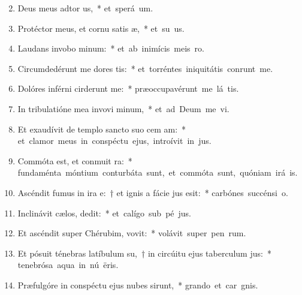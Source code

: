 \begin{flushleft}
\begin{enumerate}[leftmargin=*]
\setcounter{enumi}{1}

\item Deus meus adtor us,~* \mbox{et sperá  um.}
\item Protéctor meus, et cornu satis æ,~* \mbox{et su us.}
\item Laudans invobo minum:~* \mbox{et ab inimícis meis  ro.}
\item Circumdedérunt me dores tis:~* \mbox{et torréntes iniquitátis conrunt me.}
\item Dolóres inférni cirderunt me:~* \mbox{præoccupavérunt me lá tis.}
\item In tribulatióne mea invovi minum,~* \mbox{et ad Deum me vi.}
\item Et exaudívit de templo sancto suo cem am:~* \mbox{et clamor meus in conspéctu ejus, introívit in  jus.}
\item Commóta est, et conmuit ra:~* \mbox{fundaménta móntium conturbáta sunt, et commóta sunt, quóniam irá  is.}
\item Ascéndit fumus in ira e:~† et ignis a fácie jus esit:~* \mbox{carbónes succénsi   o.}
\item Inclinávit cælos,  dedit:~* \mbox{et calígo sub pé jus.}
\item Et ascéndit super Chérubim,  vovit:~* \mbox{volávit super pen rum.}
\item Et pósuit ténebras latíbulum su,~† in circúitu ejus taberculum jus:~* \mbox{tenebrósa aqua in nú ëris.}
\item Præfulgóre in conspéctu ejus nubes sirunt,~* \mbox{grando et car gnis.}

\end{enumerate}
\end{flushleft}
